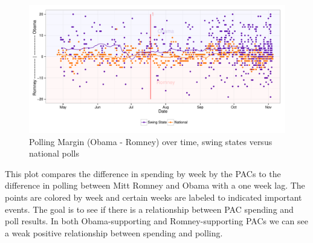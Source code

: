 \documentclass[11pt]{article}\usepackage{graphicx, color}
\newenvironment{knitrout}{}{} %
\begin{document}
\begin{knitrout}
\color{fgcolor}\begin{figure}[H]


{\centering \includegraphics[width=\textwidth]{figure/effect_plot} 

}

\caption[Polling Margin (Obama - Romney) over time, swing states versus national polls]{Polling Margin (Obama - Romney) over time, swing states versus national polls\label{fig:effect_plot}}
\end{figure}

\end{knitrout}


This plot compares the difference in spending by week by the PACs to the difference in polling between Mitt Romney and Obama with a one week lag. The points are colored by week and certain weeks are labeled to indicated important events. The goal is to see if there is a relationship between PAC spending and poll results. 
In both Obama-supporting and Romney-supporting PACs we can see a weak positive relationship between spending and polling.
\end{document}
